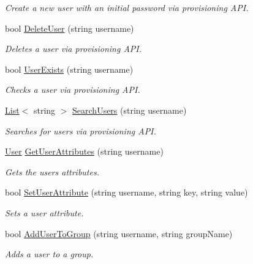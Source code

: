 \begin{DoxyCompactItemize}
\begin{DoxyCompactList}\small\item\em Create a new user with an initial password via provisioning A\+P\+I. \end{DoxyCompactList}\item 
bool \hyperlink{classowncloudsharp_1_1_client_a0603de03c323c55dc53cea24516ecf31}{Delete\+User} (string username)
\begin{DoxyCompactList}\small\item\em Deletes a user via provisioning A\+P\+I. \end{DoxyCompactList}\item 
bool \hyperlink{classowncloudsharp_1_1_client_a59adb4a3ad62adbaad112c1a6fa8201e}{User\+Exists} (string username)
\begin{DoxyCompactList}\small\item\em Checks a user via provisioning A\+P\+I. \end{DoxyCompactList}\item 
\hyperlink{classowncloudsharp_1_1_client_a914c144ebbe207958829523f7eda3609}{List}$<$ string $>$ \hyperlink{classowncloudsharp_1_1_client_ae50362f45f53ffe21fde6651f0873c0e}{Search\+Users} (string username)
\begin{DoxyCompactList}\small\item\em Searches for users via provisioning A\+P\+I. \end{DoxyCompactList}\item 
\hyperlink{classowncloudsharp_1_1_types_1_1_user}{User} \hyperlink{classowncloudsharp_1_1_client_ad3907603f1510c65ec3de52897257457}{Get\+User\+Attributes} (string username)
\begin{DoxyCompactList}\small\item\em Gets the user\textquotesingle{}s attributes. \end{DoxyCompactList}\item 
bool \hyperlink{classowncloudsharp_1_1_client_a788f66e2d774a7c47e0a46918a50c5b5}{Set\+User\+Attribute} (string username, string key, string value)
\begin{DoxyCompactList}\small\item\em Sets a user attribute. \end{DoxyCompactList}\item 
bool \hyperlink{classowncloudsharp_1_1_client_a7b8657d971f2b1a9f27f2b8cfc73a21b}{Add\+User\+To\+Group} (string username, string group\+Name)
\begin{DoxyCompactList}\small\item\em Adds a user to a group. \end{DoxyCompactList}\item 

\end{DoxyCompactItemize}
